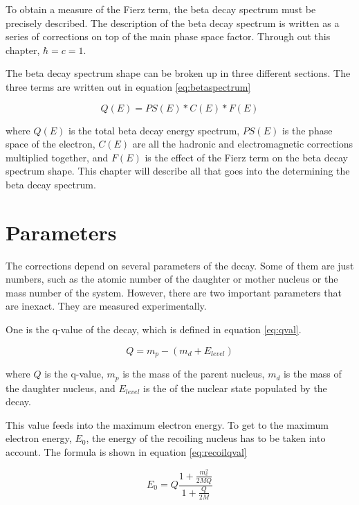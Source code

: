 

%
To obtain a measure of the Fierz term, the beta decay spectrum must be precisely described.
The description of the beta decay spectrum is written as a series of corrections on top of the main phase space factor.  
Through out this chapter, $\hbar = c = 1$.

The beta decay spectrum shape can be broken up in three different sections.
The three terms are written out in equation \ref{eq:betaspectrum}

\begin{equation}
	Q(E) = PS(E) * C(E) * F(E)
	\label{eq:betaspectrum}
\end{equation}

where $Q(E)$ is the total beta decay energy spectrum, $PS(E)$ is the phase space of the electron, $C(E)$ are all the hadronic and electromagnetic corrections multiplied together, and $F(E)$ is the effect of the Fierz term on the beta decay spectrum shape.
This chapter will describe all that goes into the determining the beta decay spectrum.

\section{Parameters}
The corrections depend on several parameters of the decay. 
Some of them are just numbers, such as the atomic number of the daughter or mother nucleus or the mass number of the system.
However, there are two important parameters that are inexact.
They are measured experimentally.

One is the q-value of the decay, which is defined in equation \ref{eq:qval}.

\begin{equation}
	Q = m_{p} - (m_{d} + E_{level})
	\label{eq:qval}
\end{equation} 

where $Q$ is the q-value, $m_{p}$ is the mass of the parent nucleus, $m_{d}$ is the mass of the daughter nucleus, and $E_{level}$ is the of the nuclear state populated by the decay. 

This value feeds into the maximum electron energy.
To get to the maximum electron energy, $E_{0}$, the energy of the recoiling nucleus has to be taken into account.
The formula is shown in equation \ref{eq:recoilqval}

\begin{equation}
	E_{0} = Q\frac{1 + \frac{m_{e}^{2}}{2MQ}}{1 + \frac{Q}{2M}} 
	\label{eq:recoilqval}
\end{equation} 

